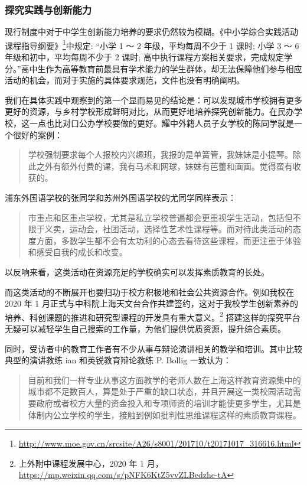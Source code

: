 \documentclass[12pt,UTF8]{ctexart}
\begin{document}
\subsubsection {探究实践与创新能力}
\par {
	
	现行制度中对于中学生创新能力培养的要求仍然较为模糊。《中小学综合实践活动课程指导纲要》\footnote{\url{http://www.moe.gov.cn/srcsite/A26/s8001/201710/t20171017_316616.html}}中规定:
	“小学 1 ～ 2 年级，平均每周不少于 1 课时; 小学 3 ～ 6 年级和初中，平均每周不少于 2 课时;
	高中执行课程方案相关要求，完成规定学分。”高中生作为高等教育前最具有学术能力的学生群体，却无法保障他们参与相应活动的机会，而对于实施的具体要求规范，文件也没有明确阐明。
}
\par {
	
	我们在具体实践中观察到的第一个显而易见的结论是：可以发现城市学校拥有更多更好的资源，与乡村学校形成鲜明对比，从而更好地培养探究创新能力。在民办学校，这一点也比对口公办学校要做的更好。耀中外籍人员子女学校的陈同学就是一个很好的案例：
	\begin{quote}
		\kaishu 学校强制要求每个人报校内兴趣班，我报的是单簧管，我妹妹是小提琴。除此之外有额外付费的课，我有马术和网球，妹妹有芭蕾和画画。觉得蛮有收获的。
	\end{quote}
	浦东外国语学校的张同学和苏州外国语学校的尤同学同样表示：
	\begin{quote}
		\kaishu
		市重点和区重点学校，尤其是私立学校普遍都会更重视学生活动，包括但不限于义卖，运动会，社团活动，选择性艺术性课程等。而对待此类活动的态度方面，多数学生都不会有太功利的心态去看待这些课程，而更注重于体验和感受自我的成长和改变。
	\end{quote}
	以反响来看，这类活动在资源充足的学校确实可以发挥素质教育的长处。
}
\par {
	而这类活动的不断展开也要归功于校方积极地和社会公共资源合作。例如我校在 2020 年 1
	月正式与中科院上海天文台合作共建签约，这对于我校学生创新素养的培养、科创课题的推进和研究型课程的开发具有重大意义。\footnote{上外附中课程发展中心，2020
		年 1 月，\url{https://mp.weixin.qq.com/s/pNFK6KtZ5vvZLBedzhe-tA}}
	搭建这样的探究平台无疑可以减轻学生自己搜索的工作量，为他们提供优质资源，提升综合素质。
}
\par {
	同时，受访者中的教育工作者有不少从事与辩论演讲相关的教学和培训。其中比较典型的演讲教练 ian 和英锐教育辩论教练 P. Bollig 一致认为：
	\begin{quote}
		\kaishu
		目前和我们一样专业从事这方面教学的老师人数在上海这样教育资源集中的城市都不足数百人，算是处于严重的缺口状态，并且开展这一类校园活动需要政府或者校方大量的资金投入和专项师资的培训才能使更多学生，尤其是体制内公立学校的学生，接触到例如批判性思维课程这样的素质教育课程。
	\end{quote}
}
\end{document}
